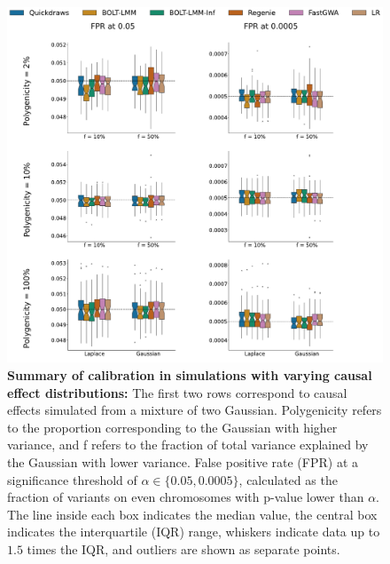 \begin{figure}[h!]
    \centering
    \includegraphics[width=\textwidth]{figures/sim_calibration/mog_fpr.pdf}
    \caption{
    \textbf{Summary of calibration in simulations with varying causal effect distributions: }
    The first two rows correspond to causal effects simulated from a mixture of two Gaussian. 
    Polygenicity refers to the proportion corresponding to the Gaussian with higher variance, and f refers to the fraction of total variance explained by the Gaussian with lower variance.
    False positive rate (FPR) at a significance threshold of $\alpha \in \{0.05, 0.0005\}$, calculated as the fraction of variants on even chromosomes with p-value lower than $\alpha$.
    The line inside each box indicates the median value, the central box indicates the interquartile (IQR) range, whiskers indicate data up to $1.5$ times the IQR, and outliers are shown as separate points.
    \label{fig:sim_calib_mog}
    }
\end{figure}

